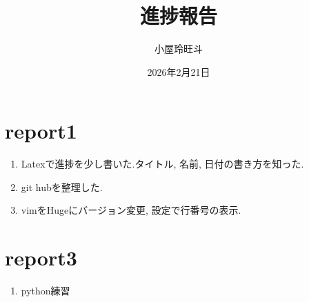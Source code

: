 \documentclass{jlreq}
\begin{document}
\title{進捗報告}
\author{小屋玲旺斗}
\date{2026年2月21日}
\maketitle

\section{report1}
\begin{enumerate}
  \item Latexで進捗を少し書いた.タイトル, 名前, 日付の書き方を知った.
  \item git hubを整理した.
  \item vimをHugeにバージョン変更, 設定で行番号の表示.
\end{enumerate}

\section{report3}
\begin{enumerate}
  \item python練習
\end{enumerate}
\end{document}
